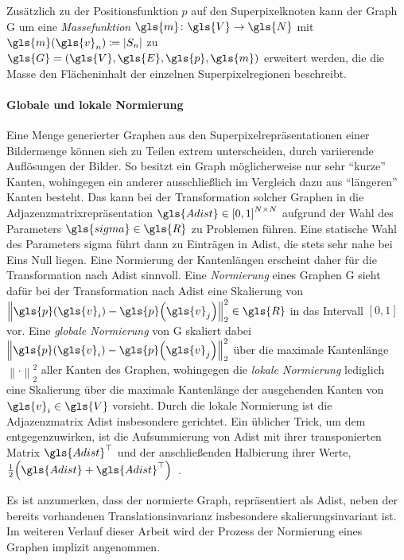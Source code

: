 Zusätzlich zu der Positionsfunktion $p$ auf den Superpixelknoten kann der Graph \gls{G} um eine \emph{Massefunktion} $\gls{m} \colon \gls{V} \to \gls{N}$ mit $\gls{m}\left(\gls{v}_n\right) \coloneqq \left|S_n\right|$ zu $\gls{G} = \left(\gls{V}, \gls{E}, \gls{p}, \gls{m}\right)$ erweitert werden, die die Masse \bzw{} den Flächeninhalt der einzelnen Superpixelregionen beschreibt.

\paragraph{Globale und lokale Normierung}
\label{globale_lokale_normierung}

Eine Menge generierter Graphen aus den Superpixelrepräsentationen einer Bildermenge können sich zu Teilen extrem unterscheiden, \bspw{} durch variierende Auflösungen der Bilder.
So besitzt ein Graph möglicherweise nur sehr \enquote{kurze} Kanten, wohingegen ein anderer ausschließlich im Vergleich dazu aus \enquote{längeren} Kanten besteht.
Das kann bei der Transformation solcher Graphen in die Adjazenzmatrixrepräsentation $\gls{Adist} \in {\left[0, 1\right]}^{N \times N}$ aufgrund der Wahl des Parameters $\gls{sigma} \in \gls{R}$ zu Problemen führen.
Eine statische Wahl des Parameters \gls{sigma} führt dann \ggf{} zu Einträgen in \gls{Adist}, die stets sehr nahe bei Eins \bzw{} Null liegen.
Eine Normierung der Kantenlängen erscheint daher für die Transformation nach \gls{Adist} sinnvoll.
Eine \emph{Normierung} eines Graphen \gls{G} sieht dafür bei der Transformation nach \gls{Adist} eine Skalierung von ${\left\|\gls{p}\left(\gls{v}_i\right) - \gls{p}\left(\gls{v}_j\right)\right\|}_2^2 \in \gls{R}$ in das Intervall $\left[0, 1\right]$ vor.
Eine \emph{globale Normierung} von \gls{G} skaliert dabei ${\left\|\gls{p}\left(\gls{v}_i\right) - \gls{p}\left(\gls{v}_j\right)\right\|}_2^2$ über die maximale Kantenlänge ${\left\|\cdot\right\|}_2^2$ aller Kanten des Graphen, wohingegen die \emph{lokale Normierung} lediglich eine Skalierung über die maximale Kantenlänge der ausgehenden Kanten von $\gls{v}_i \in \gls{V}$ vorsieht.
Durch die lokale Normierung ist die Adjazenzmatrix \gls{Adist} insbesondere gerichtet.
Ein üblicher Trick, um dem entgegenzuwirken, ist die Aufsummierung von \gls{Adist} mit ihrer transponierten Matrix $\gls{Adist}^{\top}$ und der anschließenden Halbierung ihrer Werte, \dhe{} $\frac{1}{2}\left(\gls{Adist} + \gls{Adist}^{\top}\right)$~\cite{Reuter}.

Es ist anzumerken, dass der normierte Graph, repräsentiert als \gls{Adist}, neben der bereits vorhandenen Translationsinvarianz insbesondere skalierungsinvariant ist.
Im weiteren Verlauf dieser Arbeit wird der Prozess der Normierung eines Graphen implizit angenommen.

